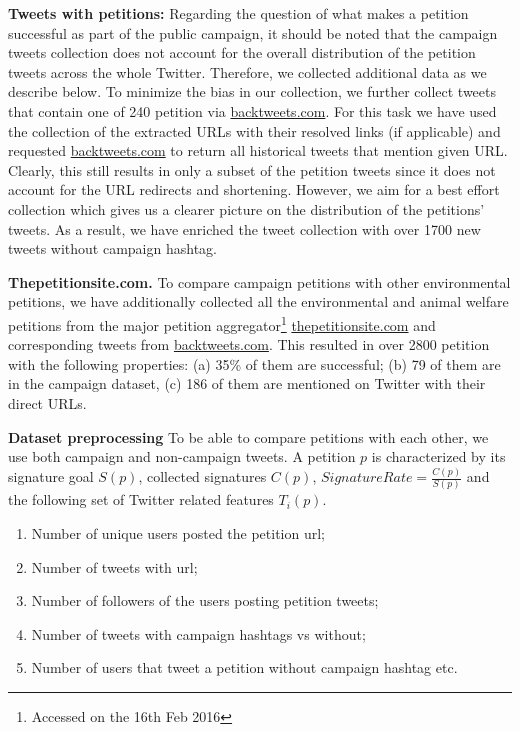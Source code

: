 \textbf{Tweets with petitions:}
Regarding the question of what makes a petition successful as part of the public campaign,
it should be noted that the campaign tweets collection does not account for the overall distribution of the petition tweets across the whole Twitter. 
Therefore, we collected additional data as we describe below.
To minimize the bias in our collection, we further collect tweets that contain one of 240 petition via \url{backtweets.com}. For this task we have used the collection of the extracted URLs with their resolved links (if applicable) and requested \url{backtweets.com} to return all historical tweets that mention given URL.
Clearly, this still results in only a subset of the petition tweets since it does not account for the URL redirects and shortening. However, we aim for a best effort collection which gives us a clearer picture on the distribution of the petitions' tweets.
As a result, we have enriched the tweet collection with over 1700 new tweets without campaign hashtag.

\textbf{Thepetitionsite.com.} To compare campaign petitions with other environmental petitions, we have additionally collected all the environmental and animal welfare petitions from the major petition aggregator\footnote{Accessed on the 16th Feb 2016} \url{thepetitionsite.com} and corresponding tweets from \url{backtweets.com}. This resulted in over 2800 petition with the following properties: (a) 35\% of them are successful; (b) 79 of them are in the campaign dataset, (c) 186 of them are mentioned on Twitter with their direct URLs.

\textbf{Dataset preprocessing}
To be able to compare petitions with each other, we use both campaign and non-campaign tweets.
A petition $p$ is characterized by its signature goal $S(p)$, collected signatures $C(p)$, $SignatureRate = \frac{C(p)}{S(p)}$ and the following set of Twitter related features $T_i(p)$.
\begin{enumerate}
	\setlength\itemsep{0em}
	\item Number of unique users posted the petition url;
	\item Number of tweets with url;
	\item Number of followers of the users posting petition tweets;
	\item Number of tweets with campaign hashtags vs without;
	\item Number of users that tweet a petition without campaign hashtag etc.
\end{enumerate}